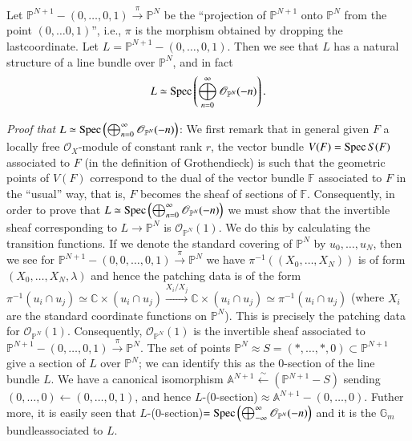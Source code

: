 {Let $\mathbb{P}^{N+1}-(0,\ldots,0,1)\xrightarrow{\pi}\mathbb{P}^{N}$
be the ``projection of $\mathbb{P}^{N+1}$ onto $\mathbb{P}^{N}$ from
the point $(0,\ldots0,1)$'', i.e., $\pi$ is the morphism obtained
by dropping the last\pageoriginale coordinate. Let
$L=\mathbb{P}^{N+1}-(0,\ldots,0,1)$. Then we see that $L$ has a
natural structure of a line bundle over $\mathbb{P}^{N}$, and in fact 
$$
L\simeq \operatorname{Spec} \left(\bigoplus_{n=0}^{\infty} \mathscr{O}_{\mathbb{P}^{N}}(-n)\right).
$$

{\em Proof that }
$L\simeq \operatorname{Spec} \left(\bigoplus_{n=0}^{\infty} \mathscr{O}_{\mathbb{P}^{N}}(-n)\right)$:
We first remark that in general given $F$ a locally free
$\mathscr{O}_X$-module of constant rank $r$, the vector bundle
$V(F)=\operatorname{Spec} S(F)$ associated to $F$ (in the definition of
Grothendieck) is such that the geometric points of $V(F)$ correspond
to the dual of the vector bundle $\mathbb{F}$ associated to $F$ in the
``usual'' way, that is, $F$ becomes the sheaf of sections of
$\mathbb{F}$. Consequently, in order to prove that
$L\simeq \operatorname{Spec} \left(\bigoplus_{n=0}^{\infty} \mathscr{O}_{\mathbb{P}^{N}}(-n)\right)$
we must show that the invertible sheaf corresponding to
$L\to \mathbb{P}^{N}$ is $\mathscr{O}_{\mathbb{P}^{N}}(1)$. We do this
by calculating the transition functions. If we denote the standard
covering of $\mathbb{P}^{N}$ by $u_0,\ldots,u_N$, then we see for
$\mathbb{P}^{N+1}-(0,0,\ldots,0,1)\xrightarrow{\pi}\mathbb{P}^{N}$ we
have $\pi^{-1}((X_0,\ldots,X_N))$ is of form $(X_0,\ldots,
X_N, \lambda)$ and hence the patching data is of the form
$\pi^{-1}(u_i\cap u_j)\simeq\mathbb{C}\times(u_i\cap
u_j)\xrightarrow{X_i/X_j}\mathbb{C}\times(u_i\cap
u_j)\simeq \pi^{-1}(u_i\cap u_j)$ (where $X_i$ are the standard
coordinate functions on $\mathbb{P}^{N}$). This is precisely the
patching data for $\mathscr{O}_{\mathbb{P}^{N}}(1)$. Consequently,
$\mathscr{O}_{\mathbb{P}^{N}}(1)$ is the invertible sheaf associated
to
$\mathbb{P}^{N+1}-(0,\ldots,0,1)\xrightarrow{\pi} \mathbb{P}^{N}$. The
set of points $\mathbb{P}^{N}\approx
S=(\ast,\ldots,\ast,0)\subset\mathbb{P}^{N+1}$ give a section of $L$
over $\mathbb{P}^{N}$; we can identify this as the $0$-section of the
line bundle $L$. We have a canonical isomorphism
$\mathbb{A}^{N+1}\xleftarrow{\sim}(\mathbb{P}^{N+1}-S)$ sending
$(0,\ldots,0)\leftarrow(0,\ldots,0,1)$, and hence
$L$-($0$-section)$\approx \mathbb{A}^{N+1}-(0,\ldots,0)$. Futher more,
it is easily seen that
$L$-($0$-section)$=\operatorname{Spec} \left(\bigoplus_{-\infty}^{\infty} \mathscr{O}_{\mathbb{P}^{N}}(-n)\right)$
and it is the $\mathbb{G}_m$ bundle\pageoriginale associated to $L$. 

}
